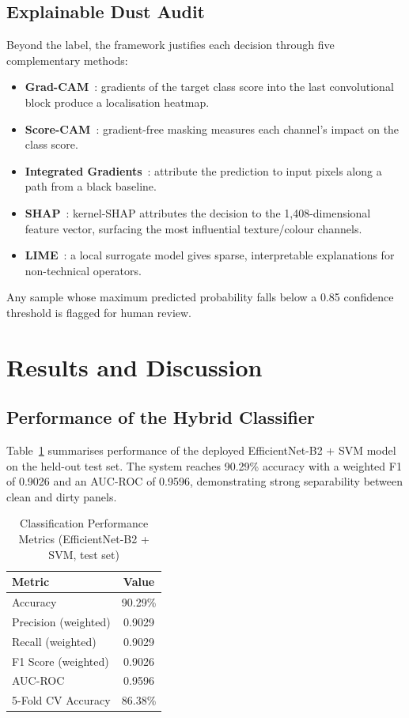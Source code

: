 \documentclass{IEEEtran}
\begin{document}
\subsection{Explainable Dust Audit}
Beyond the label, the framework justifies each decision through five complementary methods:
\begin{itemize}
\item \textbf{Grad-CAM}~\cite{selvaraju2017grad}: gradients of the target class score into the last convolutional block produce a localisation heatmap.
\item \textbf{Score-CAM}~\cite{wang2020score}: gradient-free masking measures each channel's impact on the class score.
\item \textbf{Integrated Gradients}~\cite{sundararajan2017axiomatic}: attribute the prediction to input pixels along a path from a black baseline.
\item \textbf{SHAP}~\cite{lundberg2017unified}: kernel-SHAP attributes the decision to the 1,408-dimensional feature vector, surfacing the most influential texture/colour channels.
\item \textbf{LIME}~\cite{ribeiro2016should}: a local surrogate model gives sparse, interpretable explanations for non-technical operators.
\end{itemize}
Any sample whose maximum predicted probability falls below a 0.85 confidence threshold is flagged for human review.

\section{Results and Discussion}

\subsection{Performance of the Hybrid Classifier}
Table~\ref{tab:metrics} summarises performance of the deployed EfficientNet-B2 + SVM model on the held-out test set. The system reaches 90.29\% accuracy with a weighted F1 of 0.9026 and an AUC-ROC of 0.9596, demonstrating strong separability between clean and dirty panels.

\begin{table}[t]
  \centering
  \caption{Classification Performance Metrics (EfficientNet-B2 + SVM, test set)}
  \label{tab:metrics}
  \begin{tabular}{lc}
    \toprule
    \textbf{Metric} & \textbf{Value} \\
    \midrule
    Accuracy & 90.29\% \\
    Precision (weighted) & 0.9029 \\
    Recall (weighted) & 0.9029 \\
    F1 Score (weighted) & 0.9026 \\
    AUC-ROC & 0.9596 \\
    5-Fold CV Accuracy & 86.38\% \\
    \bottomrule
  \end{tabular}
\end{table}
\end{document}
